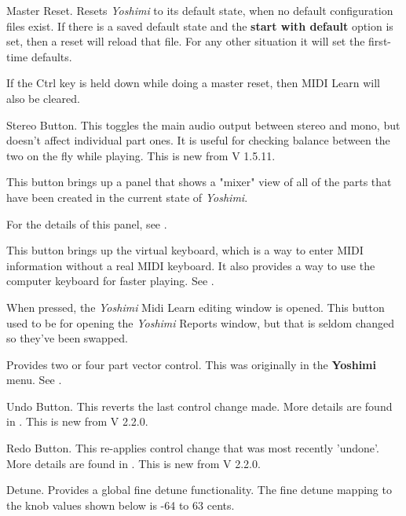    Master Reset.
   Resets \textsl{Yoshimi} to its default state, when no default configuration
   files exist.  If there is a saved default state and the \textbf{start with
   default} option is set, then a reset will reload that file. For any other
   situation it will set the first-time defaults.

   If the Ctrl key is held down while doing a master reset, then
   MIDI Learn will also be cleared.

   Stereo Button.
   This toggles the main audio output between stereo and mono, but doesn't
   affect individual part ones.
   It is useful for checking balance between the two on the fly while playing.
   This is new from V 1.5.11.

   This button brings up a panel that shows a "mixer" view
   of all of the parts that have been created in the current
   state of \textsl{Yoshimi}.

   For the details of this panel,
   see .

   This button brings up the virtual keyboard, which is a way to enter
   MIDI information without a real MIDI keyboard.
   It also provides a way to use the computer keyboard for faster
   playing.  See .

   When pressed, the \textsl{Yoshimi} Midi Learn editing window is opened.
   This button used to be for opening the \textsl{Yoshimi} Reports window,
   but that is seldom changed so they've been swapped.

   Provides two or four part vector control.  This was originally in the \textbf{Yoshimi} menu.  See
   .

   Undo Button.
   This reverts the last control change made. More details are found in .
   This is new from V 2.2.0.

   Redo Button.
   This re-applies control change that was most recently 'undone'.
   More details are found in .
   This is new from V 2.2.0.

   Detune.  Provides a global fine detune functionality.
   The fine detune mapping to the knob values shown below is
   -64 to 63 cents.


